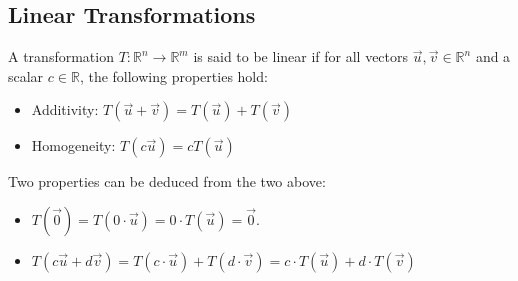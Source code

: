 \subsection{Linear Transformations}
\begin{definition}
    A transformation $T: \mathbb{R}^n \to \mathbb{R}^m$ is said to be linear if for all vectors $\vec{u}, \vec{v} \in \mathbb{R}^n$ and a scalar $c \in \mathbb{R}$, the following properties hold:
    \begin{itemize}[itemsep=1pt,label=$\circ$]
        \item Additivity: $T(\vec{u} + \vec{v}) = T(\vec{u}) + T(\vec{v})$
        \item Homogeneity: $T(c \vec{u}) = c T(\vec{u})$
    \end{itemize}
\end{definition}
Two properties can be deduced from the two above:
\begin{itemize}[itemsep=1pt,label=$\circ$]
    \item $T(\vec{0}) = T(0 \cdot \vec{u}) = 0 \cdot T(\vec{u}) = \vec{0}$.
    \item $T(c \vec{u} + d \vec{v}) = T(c \cdot \vec{u}) + T(d \cdot \vec{v}) = c \cdot T(\vec{u}) + d \cdot T(\vec{v})$
\end{itemize}

